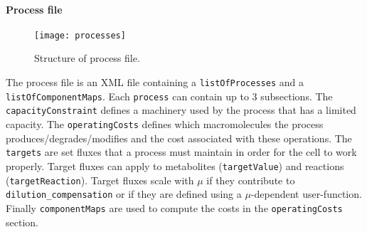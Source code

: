\paragraph{Process file}
\begin{figure}[ht]
  \centering
  \texttt{[image: processes]}
  \caption{Structure of process file.}
  \label{fig:processes}
\end{figure}
The process file is an XML file containing a \texttt{listOfProcesses} and a \texttt{listOfComponentMaps}. Each \texttt{process} can contain up to 3 subsections. The \texttt{capacityConstraint} defines a machinery used by the process that has a limited capacity. The \texttt{operatingCosts} defines which macromolecules the process produces/degrades/modifies and the cost associated with these operations. The \texttt{targets} are set fluxes that a process must maintain in order for the cell to work properly. Target fluxes can apply to metabolites (\texttt{targetValue}) and reactions (\texttt{targetReaction}). Target fluxes scale with $\mu$ if they contribute to \texttt{dilution\_compensation} or if they are defined using a $\mu$-dependent user-function. Finally \texttt{componentMaps} are used to compute the costs in the \texttt{operatingCosts} section.
